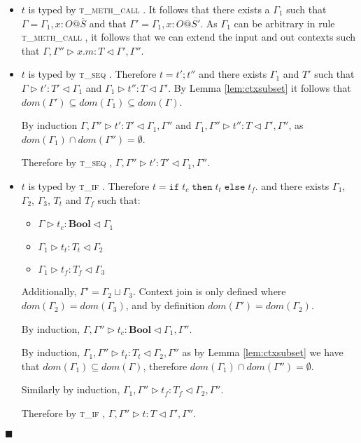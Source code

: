 \documentclass[preprint]{sigplanconf}
\newcommand{\lemref}[1]{Lemma \ref{#1}}
\newcommand{\tif}{\textsc{t\_if} }
\newcommand{\tseq}{\textsc{t\_seq} }
\newcommand{\tmethc}{\textsc{t\_meth\_call} }
\newcommand{\typerule}[4]{#1 \triangleright #2 : #3 \triangleleft #4}
\newcommand{\boolt}{\mathbf{Bool}}
\newcommand{\ift}[3]{\mathtt{if} \; #1 \; \mathtt{then} \; #2 \; \mathtt{else} \; #3}
\newcommand{\qed}{$\blacksquare$}
\newenvironment{proof}{\vspace{1ex}\noindent{\bf Proof}\hspace{0.5em}}
  {\hfill\qed\vspace{1ex}}
\begin{document}
\begin{proof}
\begin{itemize}
\item $t$ is typed by \tmethc. It follows that there exists
a $\Gamma_1$ such that $\Gamma = \Gamma_1, x : O@\overline{S}$ and that 
$\Gamma' = \Gamma_1, x : O@\overline{S'}$.
As $\Gamma_1$ can be arbitrary in rule \tmethc, it follows that we can
extend the input and out contexts such that
$\typerule{\Gamma, \Gamma''}{x.m}{T}{\Gamma', \Gamma''}$.

\item $t$ is typed by \tseq. Therefore $t = t' ; t''$ and there exists
$\Gamma_1$ and $T'$ such that $\typerule{\Gamma}{t'}{T'}{\Gamma_1}$
and $\typerule{\Gamma_1}{t''}{T}{\Gamma'}$. By \lemref{lem:ctxsubset}
it follows that $dom(\Gamma') \subseteq dom(\Gamma_1) \subseteq dom(\Gamma)$.

By induction
$\typerule{\Gamma, \Gamma''}{t'}{T'}{\Gamma_1, \Gamma''}$
and 
$\typerule{\Gamma_1, \Gamma''}{t''}{T}{\Gamma', \Gamma''}$,
as $dom(\Gamma_1) \cap dom(\Gamma'') = \emptyset$.

Therefore by \tseq, 
$\typerule{\Gamma, \Gamma''}{t'}{T'}{\Gamma_1, \Gamma''}$.

\item $t$ is typed by \tif. Therefore $t = \ift{t_c}{t_t}{t_f}$. and there
exists $\Gamma_1$, $\Gamma_2$, $\Gamma_3$, $T_t$ and $T_f$ such that:

\begin{itemize}
\item $\typerule{\Gamma}{t_c}{\boolt}{\Gamma_1}$
\item $\typerule{\Gamma_1}{t_t}{T_t}{\Gamma_2}$
\item $\typerule{\Gamma_1}{t_f}{T_f}{\Gamma_3}$
\end{itemize}

Additionally, $\Gamma' = \Gamma_2 \sqcup \Gamma_3$.
Context join is only defined where $dom(\Gamma_2) = dom(\Gamma_3)$,
and by definition $dom(\Gamma') = dom(\Gamma_2)$.

By induction, $\typerule{\Gamma, \Gamma''}{t_c}{\boolt}{\Gamma_1, \Gamma''}$.

By induction, $\typerule{\Gamma_1, \Gamma''}{t_t}{T_t}{\Gamma_2, \Gamma''}$
as by \lemref{lem:ctxsubset} we have that $dom(\Gamma_1) \subseteq dom(\Gamma)$,
therefore $dom(\Gamma_1) \cap dom(\Gamma'') = \emptyset$.

Similarly by induction, 
$\typerule{\Gamma_1, \Gamma''}{t_f}{T_f}{\Gamma_2, \Gamma''}$.

Therefore by \tif, $\typerule{\Gamma, \Gamma''}{t}{T}{\Gamma', \Gamma''}$.


\end{itemize}
\end{proof}
\end{document}
